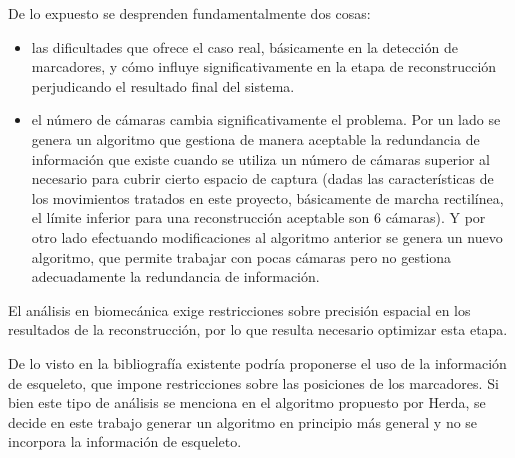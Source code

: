 De lo expuesto se desprenden fundamentalmente dos cosas:
\begin{itemize}
\item las dificultades que ofrece el caso real, básicamente en la detección de marcadores, y cómo influye significativamente en la etapa de reconstrucción perjudicando el resultado final del sistema.
\item el número de cámaras cambia significativamente el problema. Por un lado se genera un algoritmo que gestiona de manera aceptable la redundancia de información que existe cuando se utiliza un número de cámaras superior al necesario para cubrir cierto espacio de captura (dadas las características de los movimientos tratados en este proyecto, básicamente de marcha rectilínea, el límite inferior para una reconstrucción aceptable son 6 cámaras). Y por otro lado efectuando modificaciones al algoritmo anterior se genera un nuevo algoritmo, que permite trabajar con pocas cámaras pero no gestiona adecuadamente la redundancia de información.
\end{itemize} 

El análisis en biomecánica exige restricciones sobre precisión espacial en los resultados de la reconstrucción, por lo que resulta necesario optimizar esta etapa. 

De lo visto en la bibliografía existente podría proponerse el uso de la información de esqueleto, que impone restricciones sobre las posiciones de los marcadores. Si bien este tipo de análisis se menciona en el algoritmo propuesto por Herda, se decide en este trabajo generar un algoritmo en principio más general y no se incorpora la información de esqueleto. \\
 
 
 
